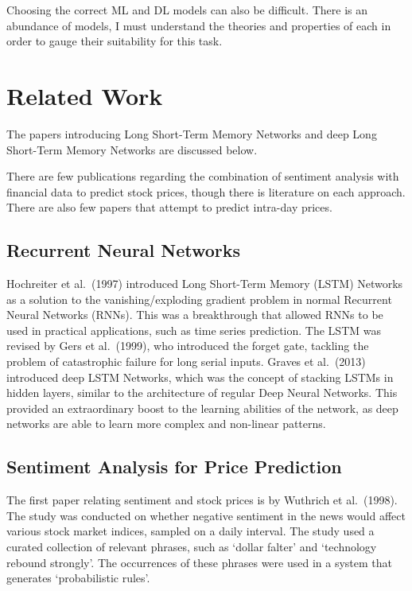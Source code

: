 \documentclass[12pt,a4paper,twoside,openright]{report}
\begin{document}
Choosing the correct ML and DL models can also be difficult.
There is an abundance of models, I must understand the theories and
properties of each in order to gauge their suitability for this task.

\section{Related Work}

The papers introducing Long Short-Term Memory Networks and deep Long Short-Term
Memory Networks are discussed below.

There are few publications regarding the combination of sentiment analysis with financial data to predict stock
prices, though there is literature on each approach. There are also few papers that attempt to predict intra-day
prices.

\subsection{Recurrent Neural Networks}

Hochreiter et al.\ (1997) introduced Long Short-Term Memory (LSTM) Networks
as a solution to the vanishing/exploding gradient problem in normal Recurrent Neural Networks (RNNs)\cite{Hochreiter97}.
This was a breakthrough that allowed RNNs to be used in practical applications, such as time series
prediction. The LSTM was revised by Gers et al.\ (1999), who introduced the forget gate, tackling
the problem of catastrophic failure for long serial inputs\cite{Gers99}.
Graves et al.\ (2013) introduced deep LSTM Networks, which was the concept of
stacking LSTMs in hidden layers, similar to the architecture of regular Deep Neural Networks. This provided
an extraordinary boost to the learning abilities of the network, as deep networks are able to learn
more complex and non-linear patterns\cite{Graves13}.

\subsection{Sentiment Analysis for Price Prediction}

The first paper relating sentiment and stock prices is by Wuthrich et al.\ (1998)\cite{Wuthrich1998}. The study
was conducted on whether negative sentiment in the news would affect various stock market indices,
sampled on a daily interval.
The study used a curated collection of relevant phrases, such as `dollar falter' and `technology
rebound strongly'. The occurrences of these phrases were used
in a system that generates `probabilistic rules'.
\end{document}
